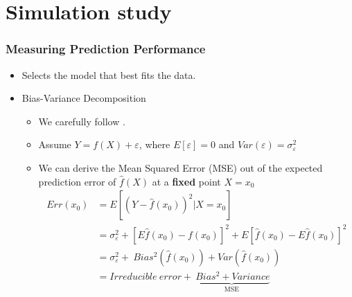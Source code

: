 \section{Simulation study}%
\begin{frame}[fragile]
    \frametitle{Measuring Prediction Performance}
    \begin{itemize}
        \item Selects the model that best fits the data.
        \item Bias-Variance Decomposition
        \begin{itemize}
            \item We carefully follow \cite{hastie2008elements}.
            \item Assume $Y=f(X) + \varepsilon$, where $E[\varepsilon]=0$ and $Var(\varepsilon)=\sigma^2_{\varepsilon}$
            \item We can derive the Mean Squared Error (MSE) out of the expected prediction error of $\hat{f}(X)$ at a \textbf{fixed} point $X = x_0$ 
            \begin{align}
            \label{}
            Err(x_0) &= E[(Y-\hat{f}(x_0))^2|X=x_0] \\
            &= \sigma^2_{\varepsilon} + [E\hat{f}(x_0) - f(x_0)]^2 + E[\hat{f}(x_0) - E\hat{f}(x_0)]^2 \\
            &= \sigma^2_{\varepsilon} + \: Bias^2(\hat{f}(x_0)) + Var(\hat{f}(x_0)) \\
            &= Irreducible \: error + \underbrace{\: Bias^2 + Variance}_\text{MSE}
            \end{align}
        \end{itemize}
    \end{itemize}
\end{frame}

